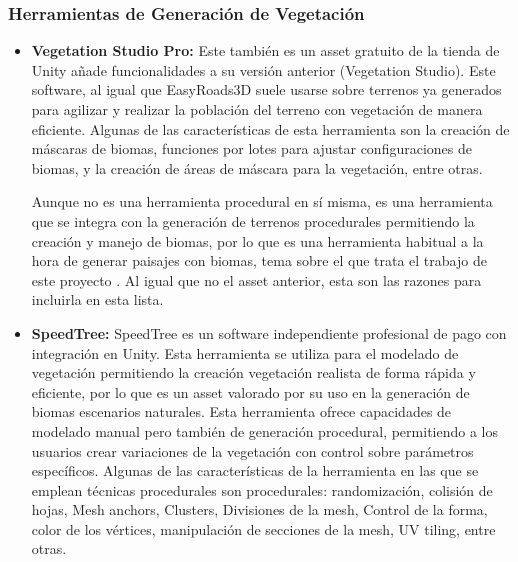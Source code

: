         \subsubsection{Herramientas de Generación de Vegetación}

            \begin{itemize}[label=\textbullet]

                \item \textbf{Vegetation Studio Pro: }
                Este también es un asset gratuito de la tienda de Unity añade funcionalidades a su versión anterior (Vegetation Studio). Este software, al igual que EasyRoads3D suele usarse sobre terrenos ya generados para agilizar y realizar la población del terreno con vegetación de manera eficiente. Algunas de las características de esta herramienta son la creación de máscaras de biomas, funciones por lotes para ajustar configuraciones de biomas, y la creación de áreas de máscara para la vegetación, entre otras. 

                Aunque no es una herramienta procedural en sí misma, es una herramienta que se integra con la generación de terrenos procedurales permitiendo la creación y manejo de biomas, por lo que es una herramienta habitual a la hora de generar paisajes con biomas, tema sobre el que trata el trabajo de este proyecto \cite{UnityAssetStoreVegetationStudioPro}. Al igual que no el asset anterior, esta son las razones para incluirla en esta lista.
                
                \item \textbf{SpeedTree:}
                SpeedTree es un software independiente profesional de pago con integración en Unity. Esta herramienta se utiliza para el modelado de vegetación permitiendo la creación vegetación realista de forma rápida y eficiente, por lo que es un asset valorado por su uso en la generación de biomas escenarios naturales. Esta herramienta ofrece capacidades de modelado manual pero también de generación procedural, permitiendo a los usuarios crear variaciones de la vegetación con control sobre parámetros específicos. Algunas de las características de la herramienta en las que se emplean técnicas procedurales son procedurales: randomización, colisión de hojas,  Mesh anchors, Clusters, Divisiones de la mesh, Control de la forma, color de los vértices, manipulación de secciones de la mesh, UV tiling, entre otras. \cite{UnitySpeedTree}
            \end{itemize}


